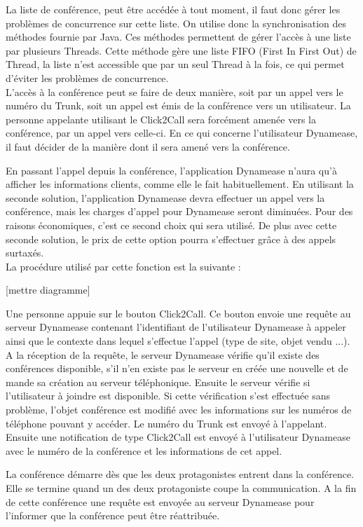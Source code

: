 La liste de conférence, peut être accédée à tout moment, il faut donc gérer les problèmes de concurrence sur cette liste. On utilise donc la synchronisation des méthodes fournie par Java. Ces méthodes permettent de gérer l'accès à une liste par plusieurs Threads. Cette méthode gère une liste FIFO (First In First Out) de Thread, la liste n'est accessible que par un seul Thread à la fois, ce qui permet d'éviter les problèmes de concurrence.\\

L'accès à la conférence peut se faire de deux manière, soit par un appel vers le numéro du Trunk, soit un appel est émis de la conférence vers un utilisateur. La personne appelante utilisant le Click2Call sera forcément amenée vers la conférence, par un appel vers celle-ci. En ce qui concerne l'utilisateur Dynamease, il faut décider de la manière dont il sera amené vers la conférence. 

En passant l'appel depuis la conférence, l'application Dynamease n'aura qu'à afficher les informations clients, comme elle le fait habituellement. En utilisant la seconde solution, l'application Dynamease devra effectuer un appel vers la conférence, mais les charges d'appel pour Dynamease seront diminuées. Pour des raisons économiques, c'est ce second choix qui sera utilisé. De plus avec cette seconde solution, le prix de cette option pourra s'effectuer grâce à des appels surtaxés.\\

La procédure utilisé par cette fonction est la suivante :

[mettre diagramme]

Une personne appuie sur le bouton Click2Call. Ce bouton envoie une requête au serveur Dynamease contenant l'identifiant de l'utilisateur Dynamease à appeler ainsi que le contexte dans lequel s'effectue l'appel (type de site, objet vendu ...). A la réception de la requête, le serveur Dynamease vérifie qu'il existe des conférences disponible, s'il n'en existe pas le serveur en créée une nouvelle et de mande sa création au serveur téléphonique. Ensuite le serveur vérifie si l'utilisateur à joindre est disponible. Si cette vérification s'est effectuée sans problème, l'objet conférence est modifié avec les informations sur les numéros de téléphone pouvant y accéder. Le numéro du Trunk est envoyé à l'appelant. Ensuite une notification de type Click2Call est envoyé à l'utilisateur Dynamease avec le numéro de la conférence et les informations de cet appel.

La conférence démarre dès que les deux protagonistes entrent dans la conférence. Elle se termine quand un des deux protagoniste coupe la communication. A la fin de cette conférence une requête est envoyée au serveur Dynamease pour l'informer que la conférence peut être réattribuée.\\

